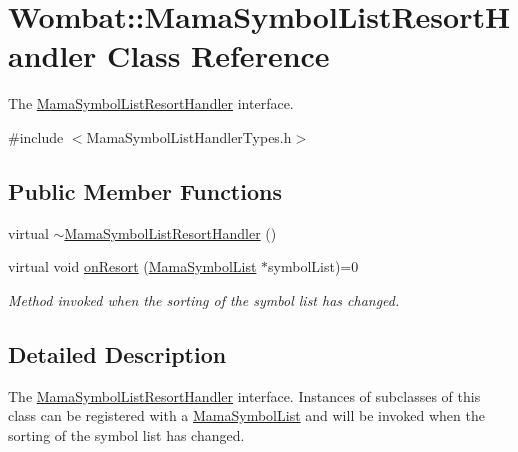 \hypertarget{classWombat_1_1MamaSymbolListResortHandler}{
\section{Wombat::MamaSymbolListResortHandler Class Reference}
\label{classWombat_1_1MamaSymbolListResortHandler}
}


The \hyperlink{classWombat_1_1MamaSymbolListResortHandler}{MamaSymbolListResortHandler} interface.  


{\ttfamily \#include $<$MamaSymbolListHandlerTypes.h$>$}\subsection*{Public Member Functions}
\begin{DoxyCompactItemize}
\item 
virtual \hyperlink{classWombat_1_1MamaSymbolListResortHandler_a37e96989dd679b574b05f081724a5e72}{$\sim$MamaSymbolListResortHandler} ()
\item 
virtual void \hyperlink{classWombat_1_1MamaSymbolListResortHandler_a952799ee3cd5653756ea395eea3a387c}{onResort} (\hyperlink{classWombat_1_1MamaSymbolList}{MamaSymbolList} $\ast$symbolList)=0
\begin{DoxyCompactList}\small\item\em Method invoked when the sorting of the symbol list has changed. \item\end{DoxyCompactList}\end{DoxyCompactItemize}


\subsection{Detailed Description}
The \hyperlink{classWombat_1_1MamaSymbolListResortHandler}{MamaSymbolListResortHandler} interface. Instances of subclasses of this class can be registered with a \hyperlink{classWombat_1_1MamaSymbolList}{MamaSymbolList} and will be invoked when the sorting of the symbol list has changed. 

